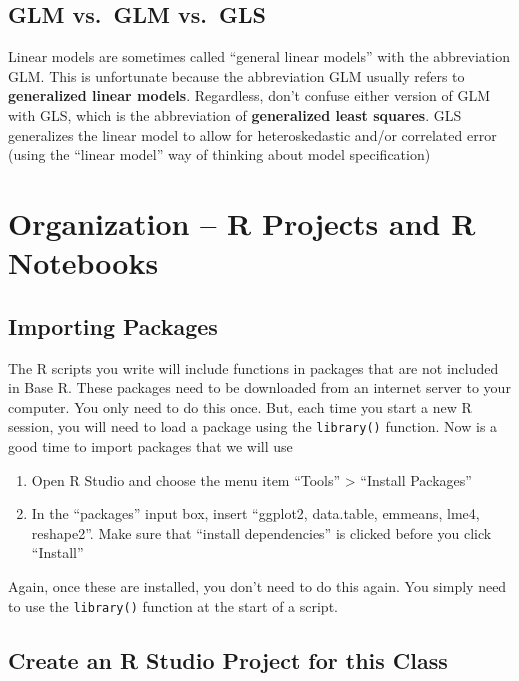 \documentclass[]{book}
\providecommand{\tightlist}{%
  \setlength{\itemsep}{0pt}\setlength{\parskip}{0pt}}
\begin{document}
\section{GLM vs.~GLM vs.~GLS}\label{glm-vs.glm-vs.gls}

Linear models are sometimes called ``general linear models'' with the
abbreviation GLM. This is unfortunate because the abbreviation GLM
usually refers to \textbf{generalized linear models}. Regardless, don't
confuse either version of GLM with GLS, which is the abbreviation of
\textbf{generalized least squares}. GLS generalizes the linear model to
allow for heteroskedastic and/or correlated error (using the ``linear
model'' way of thinking about model specification)

\chapter{Organization -- R Projects and R
Notebooks}\label{organization-r-projects-and-r-notebooks}

\section{Importing Packages}\label{importing-packages}

The R scripts you write will include functions in packages that are not
included in Base R. These packages need to be downloaded from an
internet server to your computer. You only need to do this once. But,
each time you start a new R session, you will need to load a package
using the \texttt{library()} function. Now is a good time to import
packages that we will use

\begin{enumerate}
\def\labelenumi{\arabic{enumi}.}
\tightlist
\item
  Open R Studio and choose the menu item ``Tools'' \textgreater{}
  ``Install Packages''
\item
  In the ``packages'' input box, insert ``ggplot2, data.table, emmeans,
  lme4, reshape2''. Make sure that ``install dependencies'' is clicked
  before you click ``Install''
\end{enumerate}

Again, once these are installed, you don't need to do this again. You
simply need to use the \texttt{library()} function at the start of a
script.

\section{Create an R Studio Project for this
Class}\label{create-an-r-studio-project-for-this-class}
\end{document}
